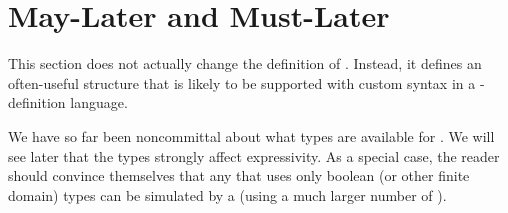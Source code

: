 \documentclass[12pt]{article}
\begin{document}



\section{May-Later and Must-Later}  \label{slater}


This section does not actually change the definition of \Contract. Instead, it defines an often-useful \Contract structure that is likely to be supported with custom syntax in a \Contract-definition language.

We have so far been noncommittal about what types are available for \GVars.%
We will see later that the types strongly affect expressivity. As a special case, the reader should convince themselves that any \Contract that uses only boolean (or other finite domain) types can be simulated by a \FSContract (using a much larger number of \States).




\end{document}
